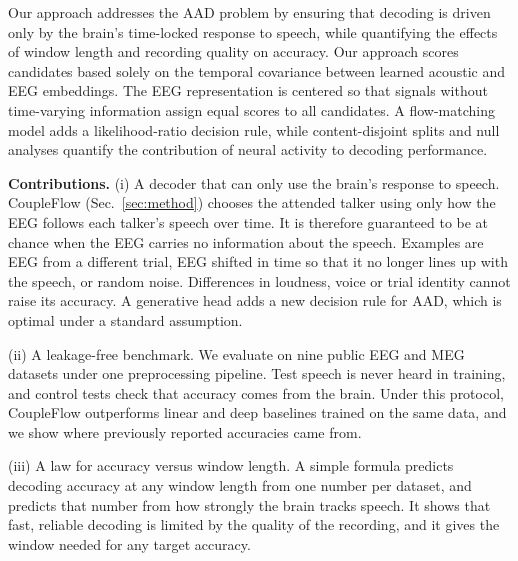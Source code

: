 \documentclass[twoside]{article}
\begin{document}
Our approach addresses the AAD problem by ensuring that decoding is driven only by the brain's time-locked response to speech, while quantifying the effects of window length and recording quality on accuracy. %
Our approach scores candidates based solely on the temporal covariance between learned acoustic and EEG embeddings. The EEG representation is centered so that signals without time-varying information assign equal scores to all candidates. A flow-matching model adds a likelihood-ratio decision rule, while content-disjoint splits and null analyses quantify the contribution of neural activity to decoding performance.

\textbf{Contributions.} %
(i) A decoder that can only use the brain's response to speech. CoupleFlow (Sec.~\ref{sec:method}) chooses the attended talker using only how the EEG follows each talker's speech over time. It is therefore guaranteed to be at chance when the EEG carries no information about the speech. Examples are EEG from a different trial, EEG shifted in time so that it no longer lines up with the speech, or random noise. Differences in loudness, voice or trial identity cannot raise its accuracy. A generative head adds a new decision rule for AAD, which is optimal under a standard assumption.

(ii) A leakage-free benchmark. We evaluate on nine public EEG and MEG datasets under one preprocessing pipeline. Test speech is never heard in training, and control tests check that accuracy comes from the brain. Under this protocol, CoupleFlow outperforms linear and deep baselines trained on the same data, and we show where previously reported accuracies came from.

(iii) A law for accuracy versus window length. A simple formula predicts decoding accuracy at any window length from one number per dataset, and predicts that number from how strongly the brain tracks speech. It shows that fast, reliable decoding is limited by the quality of the recording, and it gives the window needed for any target accuracy.
\end{document}
